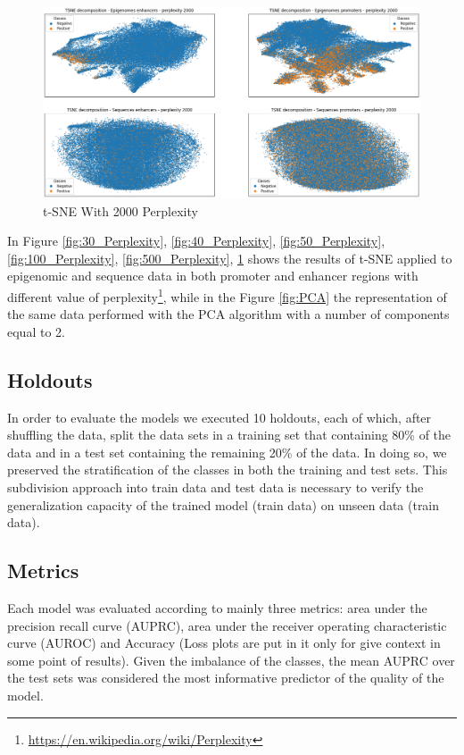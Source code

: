 \documentclass{article}
\begin{document}
\begin{figure}
    \centering
    \includegraphics[width=12cm]{image/+2000_TSNE.png}
    \caption{t-SNE With 2000 Perplexity}
    \label{fig:2000_Perplexity}
\end{figure}

\noindent
In Figure \ref{fig:30_Perplexity}, \ref{fig:40_Perplexity}, \ref{fig:50_Perplexity}, \ref{fig:100_Perplexity}, \ref{fig:500_Perplexity}, \ref{fig:2000_Perplexity} shows the results of t-SNE applied to epigenomic and sequence data in both promoter and enhancer regions with different value of perplexity\footnote{\url{https://en.wikipedia.org/wiki/Perplexity}}, while in the Figure \ref{fig:PCA} the representation of the same data performed with the PCA algorithm with a number of components equal to 2.

\subsection{Holdouts}
\label{sec:Holdouts}
In order to evaluate the models we executed 10 holdouts, each of which, after shuffling the data, split the data sets in a training set that containing 80\% of the data and in a test set containing the remaining 20\% of the data. In doing so, we preserved the stratification of the classes in both the training and test sets. This subdivision approach into train data and test data is necessary to verify the generalization capacity of the trained model (train data) on unseen data (train data).

\subsection{Metrics}
\label{sec:Metrics}
Each model was evaluated according to mainly three metrics: area under the precision recall curve (AUPRC), area under the receiver operating characteristic curve (AUROC) and Accuracy (Loss plots are put in it only for give context in some point of results). Given the imbalance of the classes, the mean AUPRC over the test sets was considered the most informative predictor of the quality of the model.
\end{document}
